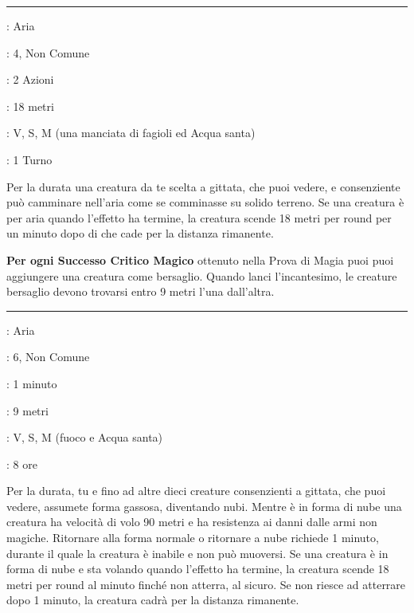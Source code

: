 \begin{multicols}{2}
\smallskip\noindent\rule{\linewidth}{2pt} \hypertarget{Camminare nell'aria}{}\medskip{}
\noindent
\begin{description}[noitemsep, topsep=0pt, parsep=0pt, partopsep=0pt, leftmargin=0cm, labelwidth=2.8cm]
	\item[\textbf{Lista di Magia}]: Aria
	\item[\textbf{Livello}]: 4, Non Comune
	\item[\textbf{T. di Lancio}]: 2 Azioni
	\item[\textbf{Gittata}]: 18 metri
	\item[\textbf{Componenti}]: V, S, M (una manciata di fagioli ed Acqua santa)
	\item[\textbf{Durata}]: 1 Turno
\end{description}

Per la durata una creatura da te scelta a gittata, che puoi vedere, e consenziente può camminare nell'aria come se comminasse su solido terreno. Se una creatura è per aria quando l'effetto ha termine, la creatura scende 18 metri per round per un minuto dopo di che cade per la distanza rimanente.

\textbf{Per ogni Successo Critico Magico} ottenuto nella Prova di Magia puoi puoi aggiungere una creatura come bersaglio. Quando lanci l'incantesimo, le creature bersaglio devono trovarsi entro 9 metri l'una dall'altra.

\smallskip\noindent\rule{\linewidth}{2pt} \hypertarget{Camminare nel Vento}{}\medskip{}
\noindent
\begin{description}[noitemsep, topsep=0pt, parsep=0pt, partopsep=0pt, leftmargin=0cm, labelwidth=2.8cm]
	\item[\textbf{Lista di Magia}]: Aria
	\item[\textbf{Livello}]: 6, Non Comune
	\item[\textbf{T. di Lancio}]: 1 minuto
	\item[\textbf{Gittata}]: 9 metri
	\item[\textbf{Componenti}]: V, S, M (fuoco e Acqua santa)
	\item[\textbf{Durata}]: 8 ore
\end{description}

Per la durata, tu e fino ad altre dieci creature consenzienti a gittata, che puoi vedere, assumete forma gassosa, diventando nubi. Mentre è in forma di nube una creatura ha velocità di volo 90 metri e ha resistenza ai danni dalle armi non magiche. Ritornare alla forma normale o ritornare a nube richiede 1 minuto, durante il quale la creatura è inabile e non può muoversi. Se una creatura è in forma di nube e sta volando quando l'effetto ha termine, la creatura scende 18 metri per round al minuto finché non atterra, al sicuro. Se non riesce ad atterrare dopo 1 minuto, la creatura cadrà per la distanza rimanente.


\end{multicols}
